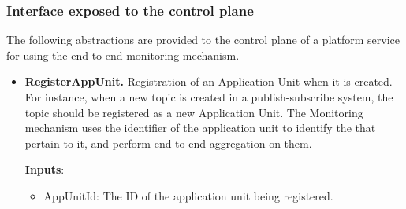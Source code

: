 \subsubsection{Interface exposed to the control plane}
The following abstractions are provided to the control plane of a platform service for using the end-to-end monitoring mechanism.
\begin{itemize}
\item \textbf{RegisterAppUnit.} Registration of an Application Unit when it is created. For instance, when a new topic is created in a publish-subscribe system, the topic should be registered as a new Application Unit. The Monitoring mechanism uses the identifier of the application unit to identify the  that pertain to it, and perform end-to-end aggregation on them. 
\par \noindent \textbf{Inputs}:
\begin{itemize}
\item AppUnitId: The ID of the application unit being registered.
\end{itemize}


\end{itemize}
